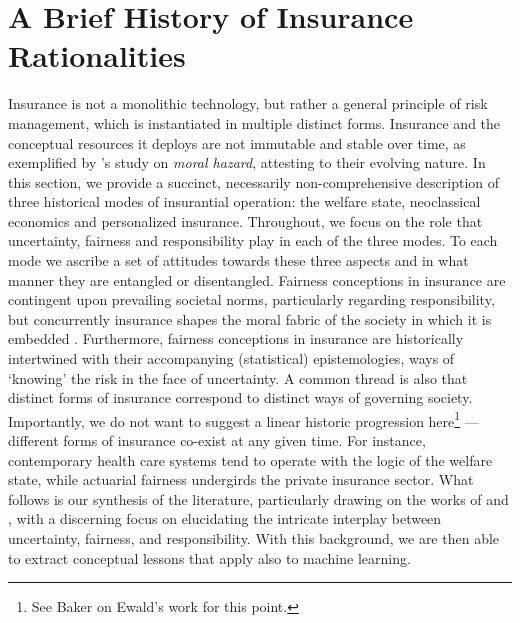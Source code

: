 \documentclass[11pt]{article} %
\begin{document}
\section{A Brief History of Insurance Rationalities}
Insurance is not a monolithic technology, but rather a general principle of risk management, which is instantiated in multiple distinct forms. %
Insurance and the conceptual resources it deploys are not immutable and stable over time, as exemplified by \citeauthor{baker1996genealogy}'s \citeyearpar{baker1996genealogy} study on \textit{moral hazard}, attesting to their evolving nature. 
In this section, we provide a succinct, necessarily non-comprehensive description of three historical modes of insurantial operation: the welfare state, neoclassical economics and personalized insurance. 
Throughout, we focus on the role that uncertainty, fairness and responsibility play in each of the three modes.
To each mode we ascribe a set of attitudes towards these three aspects and in what manner they are entangled or disentangled.
Fairness conceptions in insurance are contingent upon prevailing societal norms, particularly regarding responsibility, but concurrently insurance shapes the moral fabric of the society in which it is embedded \citep{glenn2003risk,van2006making,lehtonen2015producing}. Furthermore, fairness conceptions in insurance are historically intertwined with their accompanying (statistical) epistemologies, ways of `knowing' the risk in the face of uncertainty. A common thread is also that distinct forms of insurance correspond to distinct ways of governing society. 
Importantly, we do not want to suggest a linear historic progression here\footnote{See Baker \citeyearpar[p.\@\xspace 571]{baker2000insuring} on Ewald's work for this point.} 
--- different forms of insurance co-exist at any given time. For instance, contemporary health care systems tend to operate with the logic of the welfare state, while actuarial fairness undergirds the private insurance sector. What follows is our synthesis of the literature, particularly drawing on the works of \citet{ewald_letat_1986} and \citet{frezal2020fairness}, with a discerning focus on elucidating the intricate interplay between uncertainty, fairness, and responsibility. With this background, we are then able to extract conceptual lessons that apply also to machine learning.
\end{document}
